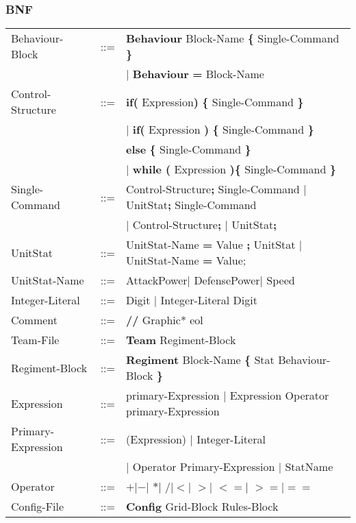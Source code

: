	\subsubsection{BNF}
		\begin{tabular}{ l l l }
			Behaviour-Block	   &	::=	 & {\bf Behaviour} Block-Name {\bf \{} Single-Command {\bf \}}  \\
							   &         & $\mid$ {\bf Behaviour} {\bf = } Block-Name \\
			Control-Structure  &  	::=  & {\bf if( } Expression{\bf )} {\bf \{ } Single-Command {\bf \} }  \\
							   &		 & $\mid$ {\bf if(} Expression {\bf )} {\bf \{ }Single-Command {\bf \}} \\
							   &   		 & {\bf else } {\bf \{ }Single-Command {\bf \} } \\					   
							   &   		 & $\mid$ {\bf while (} Expression {\bf )}{\bf \{ } Single-Command {\bf \}} \\
			Single-Command     &	::=  & Control-Structure{\bf ;} Single-Command $\mid$ UnitStat{\bf ;} Single-Command \\
							   &		 & $\mid$ Control-Structure{\bf ;} $\mid$ UnitStat{\bf ;} 					\\
			UnitStat		   &	::=  & UnitStat-Name {\bf =} Value {\bf ;} UnitStat $\mid$ UnitStat-Name {\bf = } Value; \\
			UnitStat-Name	   &	::=	 & AttackPower$\mid$ DefensePower$\mid$ Speed \\
			Integer-Literal    &	::=  & Digit $\mid$ Integer-Literal Digit \\
			Comment			   &	::=	 & {\bf //} Graphic* eol \\
			Team-File		   &	::=	 & {\bf Team} Regiment-Block \\
			Regiment-Block     &	::=	 & {\bf Regiment} Block-Name {\bf \{ } Stat Behaviour-Block \bf{\} }\\
			Expression 		   &	::=	 & primary-Expression $\mid$ Expression Operator primary-Expression \\
			Primary-Expression &	::=  & (Expression) $\mid$ Integer-Literal \\
							   &		 & $\mid$ Operator Primary-Expression $\mid$ StatName \\
			Operator 		   & 	::=	 & {\bf $+$}$\mid${\bf $-$}$\mid$ {\bf $*$}$\mid$ 
										   {\bf $/$}$\mid${\bf $<$}$\mid$ {\bf $>$}$\mid$ 
										   {\bf $<=$}$\mid$ {\bf $>=$}$\mid${\bf $==$}\\
			Config-File		   & 	::=  & {\bf Config} Grid-Block Rules-Block  		\\

\end{tabular}

